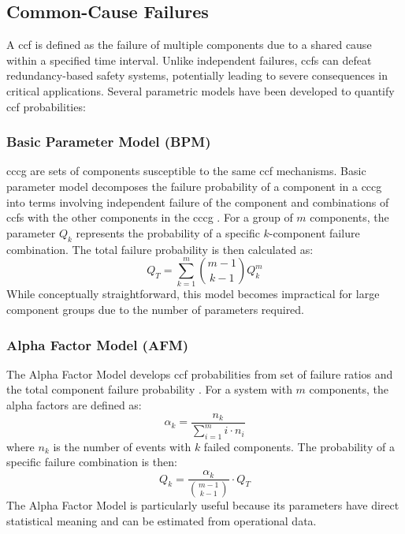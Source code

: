 \subsection{Common-Cause Failures}

A \acrfull{ccf} is defined as the failure of multiple components due to a shared cause within a specified time interval. Unlike independent failures, \acrshort{ccf}s can defeat redundancy-based safety systems, potentially leading to severe consequences in critical applications. Several parametric models have been developed to quantify \acrshort{ccf} probabilities:

\subsubsection{Basic Parameter Model (BPM)}
\acrfull{cccg} are sets of components susceptible to the same \acrshort{ccf} mechanisms. Basic parameter model decomposes the failure probability of a component in a \acrshort{cccg} into terms involving independent failure of the component and combinations of \acrshort{ccf}s with the other components in the \acrshort{cccg} \cite{rasmuson_kelly_2008}. For a group of $m$ components, the parameter $Q_k$ represents the probability of a specific $k$-component failure combination. The total failure probability is then calculated as:
\[
Q_T = \sum_{k=1}^{m} \binom{m-1}{k-1} Q_k^m
\]
While conceptually straightforward, this model becomes impractical for large component groups due to the number of parameters required.

\subsubsection{Alpha Factor Model (AFM)}
The Alpha Factor Model develops \acrshort{ccf} probabilities from set of failure ratios and the total component failure probability \cite{rasmuson_kelly_2008}. For a system with $m$ components, the alpha factors are defined as:
\[
\alpha_k = \frac{n_k}{\sum_{i=1}^{m} i \cdot n_i}
\]
where $n_k$ is the number of events with $k$ failed components. The probability of a specific failure combination is then:
\[
Q_k = \frac{\alpha_k}{\binom{m-1}{k-1}} \cdot Q_T
\]
The Alpha Factor Model is particularly useful because its parameters have direct statistical meaning and can be estimated from operational data.

